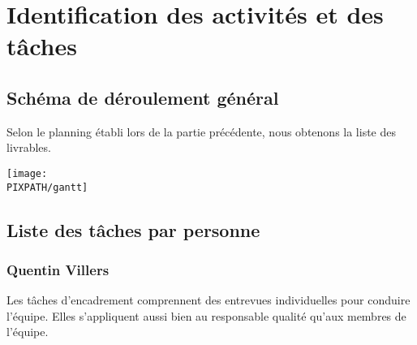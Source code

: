 \section{Identification des activités et des tâches}

\subsection{Schéma de déroulement général}

Selon le planning établi lors de la partie précédente, nous obtenons la liste des livrables.

\begin{center}
\texttt{[image: \\PIXPATH/gantt]}\hfill\\
\end{center}

\vfil
\pagebreak
\subsection{Liste des tâches par personne}

\subsubsection{Quentin Villers}

Les tâches d'encadrement comprennent des entrevues individuelles pour conduire l'équipe. 
Elles s'appliquent aussi bien au responsable qualité qu'aux membres de l'équipe. 

